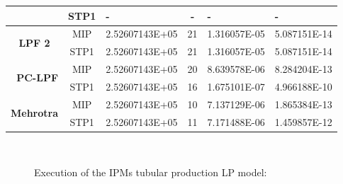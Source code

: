 \documentclass[a4paper,10 pt,titlepage,twoside]{book}
\theoremstyle{plain}
\theoremstyle{definition}
\theoremstyle{remark}
\begin{document}
{{\begin{table}[]
\begin{tabular}{cclcll}
		\multicolumn{1}{c|}{} & STP1 & - & - & - & - \\ \hline
		\multicolumn{1}{c|}{\multirow{2}{*}{\textbf{LPF 2}}} & MIP & 2.52607143E+05 & 21 & 1.316057E-05 & 5.087151E-14 \\
		\multicolumn{1}{c|}{} & STP1 & 2.52607143E+05 & 21 & 1.316057E-05 & 5.087151E-14 \\ \hline
		\multicolumn{1}{r|}{\multirow{2}{*}{\textbf{PC-LPF}}} & MIP & 2.52607143E+05 & 20 & 8.639578E-06 & 8.284204E-13 \\
		\multicolumn{1}{r|}{} & STP1 & 2.52607143E+05 & 16 & 1.675101E-07 & 4.966188E-10 \\ \hline
		\multicolumn{1}{c|}{\multirow{2}{*}{\textbf{Mehrotra}}} & MIP & 2.52607143E+05 & 10 & 7.137129E-06 & 1.865384E-13 \\
		\multicolumn{1}{c|}{} & STP1 & 2.52607143E+05 & 11 & 7.171488E-06 & 1.459857E-12 \\ \hline
	\end{tabular}
\end{table}
\begin{figure}\caption{\label{figure:tub}Execution of the IPMs tubular production LP model:}
	 \qquad%
	\\
	 \qquad%

\end{figure}}}
\end{document}
